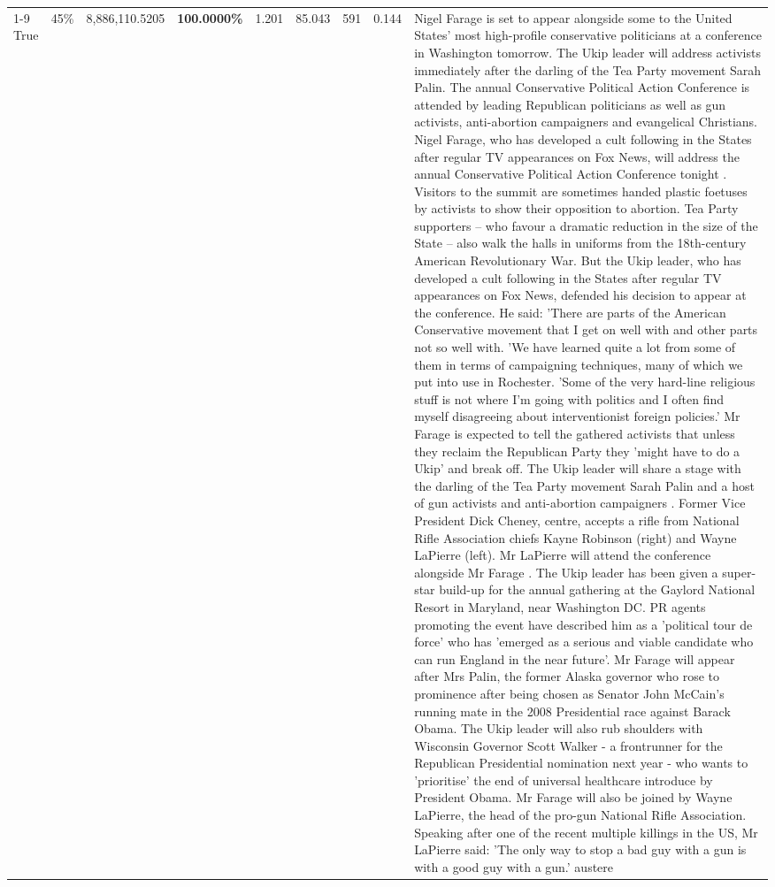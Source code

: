 \begin{table}[H]
\begin{tabular}{lllrlllll}
\cline{1-9} \cline{2-9}
True & 45\% & 8,886,110.5205 & \bfseries \color{red} 100.0000\% & 1.201 & 85.043 & 591 & 0.144 & Nigel Farage is set to appear alongside some to the United States' most high-profile conservative politicians at a conference in Washington tomorrow. The Ukip leader will address activists immediately after the darling of the Tea Party movement Sarah Palin. The annual Conservative Political Action Conference is attended by leading Republican politicians as well as gun activists, anti-abortion campaigners and evangelical Christians. Nigel Farage, who has developed a cult following in the States after regular TV appearances on Fox News, will address the annual Conservative Political Action Conference tonight . Visitors to the summit are sometimes handed plastic foetuses by activists to show their opposition to abortion. Tea Party supporters – who favour a dramatic reduction in the size of the State – also walk the halls in uniforms from the 18th-century American Revolutionary War. But the Ukip leader, who has developed a cult following in the States after regular TV appearances on Fox News, defended his decision to appear at the conference. He said: 'There are parts of the American Conservative movement that I get on well with and other parts not so well with. 'We have learned quite a lot from some of them in terms of campaigning techniques, many of which we put into use in Rochester. 'Some of the very hard-line religious stuff is not where I'm going with politics and I often find myself disagreeing about interventionist foreign policies.' Mr Farage is expected to tell the gathered activists that unless they reclaim the Republican Party they 'might have to do a Ukip' and break off. The Ukip leader will share a stage with the darling of the Tea Party movement Sarah Palin and a host of gun activists and anti-abortion campaigners . Former Vice President Dick Cheney, centre, accepts a rifle from National Rifle Association chiefs Kayne Robinson (right) and Wayne LaPierre (left). Mr LaPierre will attend the conference alongside Mr Farage . The Ukip leader has been given a super-star build-up for the annual gathering at the Gaylord National Resort in Maryland, near Washington DC. PR agents promoting the event have described him as a 'political tour de force' who has 'emerged as a serious and viable candidate who can run England in the near future'. Mr Farage will appear after Mrs Palin, the former Alaska governor who rose to prominence after being chosen as Senator John McCain's running mate in the 2008 Presidential race against Barack Obama. The Ukip leader will also rub shoulders with Wisconsin Governor Scott Walker - a frontrunner for the Republican Presidential nomination next year - who wants to 'prioritise' the end of universal healthcare introduce by President Obama. Mr Farage will also be joined by Wayne LaPierre, the head of the pro-gun National Rifle Association. Speaking after one of the recent multiple killings in the US, Mr LaPierre said: 'The only way to stop a bad guy with a gun is with a good guy with a gun.' austere \\

\end{tabular}
\end{table}
